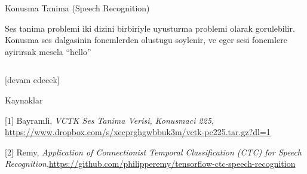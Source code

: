 \documentclass[12pt,fleqn]{article}\usepackage{../../common}
\begin{document}
Konusma Tanima (Speech Recognition)

Ses tanima problemi iki dizini birbiriyle uyusturma problemi olarak
gorulebilir. Konusma ses dalgasinin fonemlerden olustugu soylenir, ve eger
sesi fonemlere ayirirsak mesela ``hello'' 




\inputminted[fontsize=\footnotesize]{python}{train.py}


[devam edecek]

Kaynaklar

[1] Bayramli, {\em VCTK Ses Tanima Verisi, Konusmaci 225}, \url{https://www.dropbox.com/s/xecprghgwbbuk3m/vctk-pc225.tar.gz?dl=1}

[2] Remy, {\em Application of Connectionist Temporal Classification (CTC) for Speech Recognition},\url{https://github.com/philipperemy/tensorflow-ctc-speech-recognition}
\end{document}
